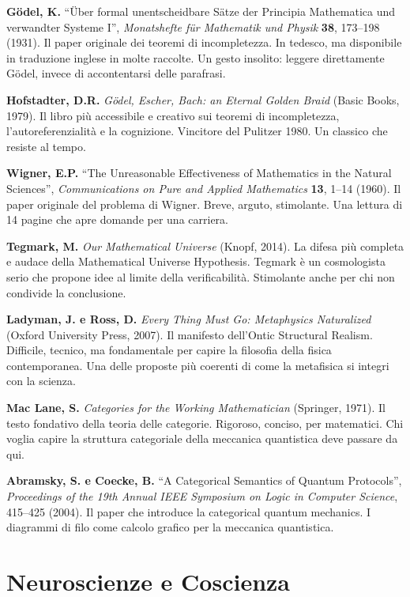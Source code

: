 \documentclass[11.5pt,a4paper,openany]{book}
\theoremstyle{remark}
\begin{document}
\textbf{Gödel, K.} ``Über formal unentscheidbare Sätze der Principia Mathematica und verwandter Systeme I'', \textit{Monatshefte für Mathematik und Physik} \textbf{38}, 173--198 (1931). Il paper originale dei teoremi di incompletezza. In tedesco, ma disponibile in traduzione inglese in molte raccolte. Un gesto insolito: leggere direttamente Gödel, invece di accontentarsi delle parafrasi.

\textbf{Hofstadter, D.R.} \textit{Gödel, Escher, Bach: an Eternal Golden Braid} (Basic Books, 1979). Il libro più accessibile e creativo sui teoremi di incompletezza, l'autoreferenzialità e la cognizione. Vincitore del Pulitzer 1980. Un classico che resiste al tempo.

\textbf{Wigner, E.P.} ``The Unreasonable Effectiveness of Mathematics in the Natural Sciences'', \textit{Communications on Pure and Applied Mathematics} \textbf{13}, 1--14 (1960). Il paper originale del problema di Wigner. Breve, arguto, stimolante. Una lettura di 14 pagine che apre domande per una carriera.

\textbf{Tegmark, M.} \textit{Our Mathematical Universe} (Knopf, 2014). La difesa più completa e audace della Mathematical Universe Hypothesis. Tegmark è un cosmologista serio che propone idee al limite della verificabilità. Stimolante anche per chi non condivide la conclusione.

\textbf{Ladyman, J. e Ross, D.} \textit{Every Thing Must Go: Metaphysics Naturalized} (Oxford University Press, 2007). Il manifesto dell'Ontic Structural Realism. Difficile, tecnico, ma fondamentale per capire la filosofia della fisica contemporanea. Una delle proposte più coerenti di come la metafisica si integri con la scienza.

\textbf{Mac Lane, S.} \textit{Categories for the Working Mathematician} (Springer, 1971). Il testo fondativo della teoria delle categorie. Rigoroso, conciso, per matematici. Chi voglia capire la struttura categoriale della meccanica quantistica deve passare da qui.

\textbf{Abramsky, S. e Coecke, B.} ``A Categorical Semantics of Quantum Protocols'', \textit{Proceedings of the 19th Annual IEEE Symposium on Logic in Computer Science}, 415--425 (2004). Il paper che introduce la categorical quantum mechanics. I diagrammi di filo come calcolo grafico per la meccanica quantistica.

\section{Neuroscienze e Coscienza}
\end{document}
